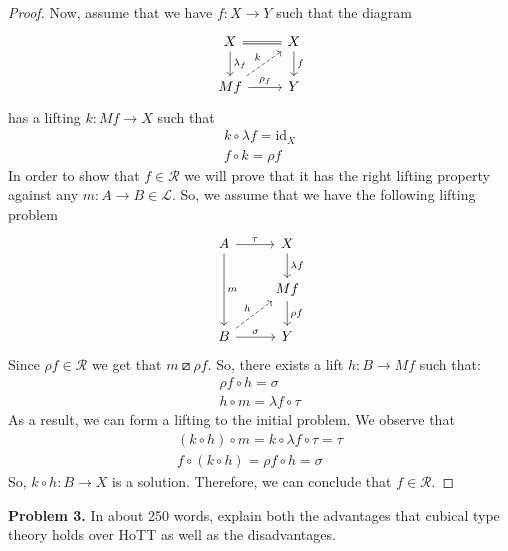 \documentclass{article}
\theoremstyle{definition}
\newcommand{\comp}{\mathbin{\circ}}
\newcommand{\idarrow}[1][]{\mathrm{id}_{#1}}
\begin{document}
\begin{proof}
Now, assume that we have $f : X \to Y$
such that the diagram
\[
 \begin{tikzcd}
    X \ar[r,equal] \ar[d,"\lambda_f"] & X \ar[d,"f"] \\
    Mf \ar[r,"\rho_f"] \ar[ur, dashed, "k"] & Y
 \end{tikzcd}
\]
has a lifting $k : M f \to X$ such that
\begin{align*}
 k \comp \lambda f = \idarrow[X] \\
 f \comp k = \rho f
\end{align*}
In order to show that $f \in \mathcal{R}$
we will prove that it has the right lifting
property against any $m : A \to B \in \mathcal{L}$.
So, we assume that we have the following
lifting problem
\[
 \begin{tikzcd}
  A \ar[dd, "m"] \rar["\tau"] & X \dar["\lambda f"] \\
  & Mf \dar["\rho f"] \\
  B \rar["\sigma"] \ar[ur, dashed, "h"] & Y
 \end{tikzcd}
\]
Since $\rho f \in \mathcal{R}$ we get that
$m \boxslash \rho f$. So, there exists a lift
$h : B \to M f$ such that:
\begin{align*}
 \rho f \comp h = \sigma \\
 h \comp m = \lambda f \comp \tau
\end{align*}
As a result, we can form a lifting to the initial
problem. We observe that
\begin{align*}
 (k \comp h) \comp m = k \comp \lambda f \comp \tau = \tau \\
 f \comp (k \comp h) = \rho f \comp h = \sigma
\end{align*}
So, $k \comp h : B \to X$ is a solution.
Therefore, we can conclude that $f \in \mathcal{R}$.
\end{proof}


\newpage

\noindent\textbf{Problem 3.} In about 250 words, explain both the advantages that cubical type theory holds over HoTT as well as the disadvantages.
\end{document}
